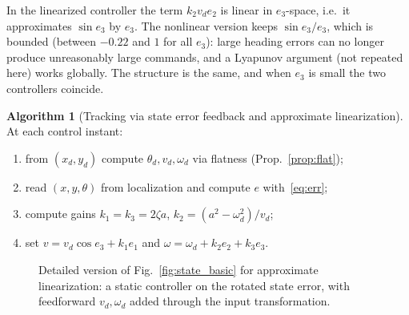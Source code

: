 \documentclass[11pt,a4paper]{article}
\def\bm#1{#1}%
\def\vect#1{#1}%
\newcommand{\vect}[1]{\bm{#1}}
\newcommand{\vd}{v_d}
\newcommand{\omd}{\omega_d}
\newcommand{\pd}{\vect{p}_d}
\newcommand{\qd}{\vect{q}_d}
\theoremstyle{definition}
\newtheorem{algorithm}[definition]{Algorithm}
\theoremstyle{plain}
\theoremstyle{remark}
\begin{document}
\begin{intuition}
In the linearized controller the term $k_2\vd e_2$ is linear in $e_3$-space, i.e.\ it approximates $\sin e_3$ by $e_3$. The nonlinear version keeps $\sin e_3/e_3$, which is bounded (between $-0.22$ and $1$ for all $e_3$): large heading errors can no longer produce unreasonably large commands, and a Lyapunov argument (not repeated here) works globally. The structure is the same, and when $e_3$ is small the two controllers coincide.
\end{intuition}

\begin{algorithm}[Tracking via state error feedback and approximate linearization]
At each control instant:
\begin{enumerate}[nosep]
\item from $(x_d,y_d)$ compute $\theta_d,\vd,\omd$ via flatness (Prop.~\ref{prop:flat});
\item read $(x,y,\theta)$ from localization and compute $\vect e$ with~\eqref{eq:err};
\item compute gains $k_1=k_3=2\zeta a$, $k_2=(a^2-\omd^2)/\vd$;
\item set $v=\vd\cos e_3+k_1e_1$ and $\omega=\omd+k_2e_2+k_3e_3$.
\end{enumerate}
\end{algorithm}

\begin{figure}[H]
\centering
{}
\caption{Detailed version of Fig.~\ref{fig:state_basic} for approximate linearization: a static controller on the rotated state error, with feedforward $\vd,\omd$ added through the input transformation.}
\label{fig:state_scheme}
\end{figure}
\end{document}
